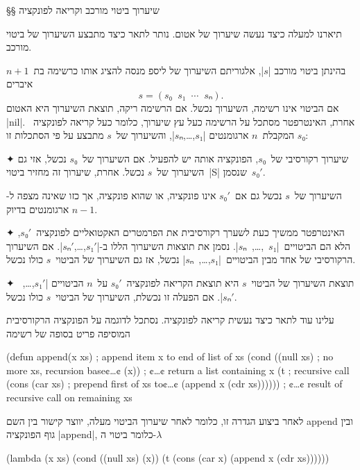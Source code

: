 \eject
§§ שיערוך ביטוי מורכב וקריאה לפונקציה

תיארנו למעלה כיצד נעשה שיערוך של אטום. נותר לתאר כיצד מתבצע השיערוך של ביטוי
מורכב.

\minipage\textwidth
\begin{mdframed}[backgroundcolor=Lavender!20]
  בהינתן ביטוי מורכב \E|$s$|, אלגוריתם השיערוך של ליספ מנסה
  להציג אותו כרשימה בת~$n+1$ איברים \[
    s=(s₀\;\;s₁\;\;⋯\;\;sₙ).
  \] אם הביטוי אינו רשימה, השיערוך נכשל. אם הרשימה ריקה, תוצאת השיערוך היא האטום
  \T|nil|. אחרת, האינטרפטר מסתכל על הרשימה כעל עץ שיערוך, כלומר כעל קריאה
  לפונקציה~$s₀$ המקבלת~$n$ ארגומנטים \E|$s₁$,…,$sₙ$|, והשיערוך
  של~$s$ מתבצע על פי הסתכלות זו:
  \begin{enumerate}
    ✦ שיערוך רקורסיבי של~$s₀$, הפונקציה אותה יש להפעיל. אם השיערוך של~$s₀$ נכשל,
    אזי גם השיערוך של~$s$ נכשל. אחרת, שיערוך זה מחזיר ביטוי~\E|S| שנסמן~$s₀'$.

    השיערוך של~$s$ נכשל גם אם~$s₀'$ אינו פונקציה, או שהוא פונקציה, אך כזו שאינה
    מצפה ל-$n-1$ ארגומנטים בדיוק.

    ✦ האינטרפטר ממשיך כעת לשערך רקורסיבית את הפרמטרים האקטואליים לפונקציה~$s₀'$,
    הלא הם הביטויים~\E|$s₁$~,…,~$sₙ$|. נסמן את תוצאות השיערוך הללו
    ב-\E|$s₁'$,…,$sₙ'$|. אם השיערוך הרקורסיבי של אחד מבין
    הביטויים~\E|$s₁$,…,~$sₙ$| נכשל, אז גם השיערוך של הביטוי~$s$
    כולו נכשל.

    ✦ תוצאת השיערוך של הביטוי~$s$ היא תוצאת הקריאה לפונקציה~$s₀'$ על~$n$ הביטויים
    \E|$s₁'$,…,~$sₙ'$|. אם הפעלה זו נכשלת, השיערוך של הביטוי~$s$ כולו נכשל.
  \end{enumerate}
\end{mdframed}
\endminipage

עלינו עוד לתאר כיצד נעשית קריאה לפונקציה. נסתכל לדוגמה על הפונקציה הרקורסיבית
המוסיפה פריט בסופה של רשימה
\begin{LISP}
(defun append(x xs) ; append item x to end of list of xs
  (cond ((null xs) ; no more xs, recursion base¢…¢
          (x)) ; ¢…¢ return a list containing x
        (t ; recursive call
          (cons
            (car xs) ; prepend first of xs to¢…¢
            (append x (cdr xs)))))) ; ¢…¢ result of recursive call on remaining xs
\end{LISP}

\minipage\textwidth
לאחר ביצוע הגדרה זו, כלומר לאחר שיערוך הביטוי מעלה, יווצר קישור בין השם append
ובין גוף הפונקציה \E|append|, כלומר ביטוי ה-$λ$
\begin{LISP}
(lambda (x xs)
  (cond ((null xs) (x))
        (t (cons
              (car x)
              (append x (cdr xs))))))
\end{LISP}
\endminipage

